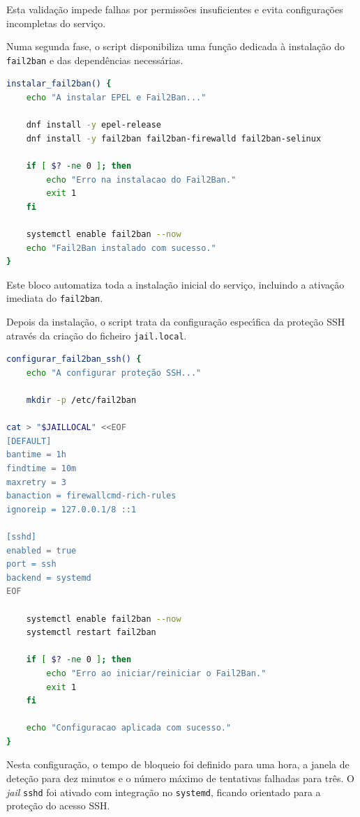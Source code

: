 Esta valida\c{c}\~ao impede falhas por permiss\~oes insuficientes e evita configura\c{c}\~oes incompletas do servi\c{c}o.

Numa segunda fase, o script disponibiliza uma fun\c{c}\~ao dedicada \`a instala\c{c}\~ao do \texttt{fail2ban} e das depend\^encias necess\'arias.

\begin{lstlisting}[language=bash,caption={Instalacao automatica do Fail2Ban}]
instalar_fail2ban() {
    echo "A instalar EPEL e Fail2Ban..."

    dnf install -y epel-release
    dnf install -y fail2ban fail2ban-firewalld fail2ban-selinux

    if [ $? -ne 0 ]; then
        echo "Erro na instalacao do Fail2Ban."
        exit 1
    fi

    systemctl enable fail2ban --now
    echo "Fail2Ban instalado com sucesso."
}
\end{lstlisting}

Este bloco automatiza toda a instala\c{c}\~ao inicial do servi\c{c}o, incluindo a ativa\c{c}\~ao imediata do \texttt{fail2ban}.

Depois da instala\c{c}\~ao, o script trata da configura\c{c}\~ao espec\'{\i}fica da prote\c{c}\~ao SSH atrav\'es da cria\c{c}\~ao do ficheiro \texttt{jail.local}.

\begin{lstlisting}[language=bash,caption={Configuracao automatica da protecao SSH}]
configurar_fail2ban_ssh() {
    echo "A configurar proteção SSH..."

    mkdir -p /etc/fail2ban

cat > "$JAILLOCAL" <<EOF
[DEFAULT]
bantime = 1h
findtime = 10m
maxretry = 3
banaction = firewallcmd-rich-rules
ignoreip = 127.0.0.1/8 ::1

[sshd]
enabled = true
port = ssh
backend = systemd
EOF

    systemctl enable fail2ban --now
    systemctl restart fail2ban

    if [ $? -ne 0 ]; then
        echo "Erro ao iniciar/reiniciar o Fail2Ban."
        exit 1
    fi

    echo "Configuracao aplicada com sucesso."
}
\end{lstlisting}

Nesta configura\c{c}\~ao, o tempo de bloqueio foi definido para uma hora, a janela de dete\c{c}\~ao para dez minutos e o n\'umero m\'aximo de tentativas falhadas para tr\^es. O \textit{jail} \texttt{sshd} foi ativado com integra\c{c}\~ao no \texttt{systemd}, ficando orientado para a prote\c{c}\~ao do acesso SSH.


